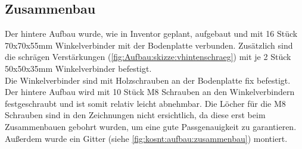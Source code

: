 \begin{landscape}
    \clearpage
    \clearpage
    \clearpage
    
\end{landscape}

\subsection{Zusammenbau}
Der hintere Aufbau wurde, wie in Inventor geplant, aufgebaut und mit 16 Stück 70x70x55mm Winkelverbinder mit der Bodenplatte verbunden. Zusätzlich sind die schrägen Verstärkungen (\autoref{fig:Aufbau:skizze:vhintenschraeg}) mit je 2 Stück 50x50x35mm Winkelverbinder befestigt.\\
Die Winkelverbinder sind mit Holzschrauben an der Bodenplatte fix befestigt. Der hintere Aufbau wird mit 10 Stück M8 Schrauben an den Winkelverbindern festgeschraubt und ist somit relativ leicht abnehmbar. Die Löcher für die M8 Schrauben sind in den Zeichnungen nicht ersichtlich, da diese erst beim Zusammenbauen gebohrt wurden, um eine gute Passgenauigkeit zu garantieren.\\
Außerdem wurde ein Gitter (siehe \autoref{fig:kosnt:aufbau:zusammenbau}) montiert.
